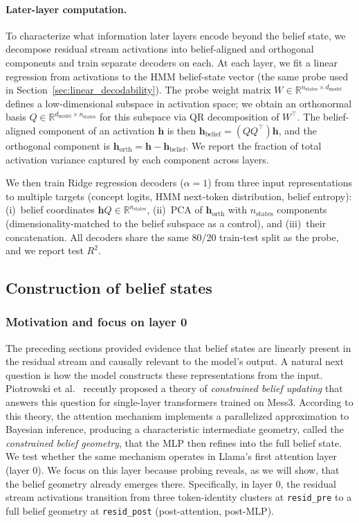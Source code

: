 \documentclass[midterm]{sparreport}
\begin{document}
\paragraph{Later-layer computation.}
\label{sec:later_layer_method}
To characterize what information later layers encode beyond the belief state, we decompose residual stream activations into belief-aligned and orthogonal components and train separate decoders on each. At each layer, we fit a linear regression from activations to the HMM belief-state vector (the same probe used in Section~\ref{sec:linear_decodability}). The probe weight matrix $W \in \mathbb{R}^{n_{\mathrm{states}} \times d_{\mathrm{model}}}$ defines a low-dimensional subspace in activation space; we obtain an orthonormal basis $Q \in \mathbb{R}^{d_{\mathrm{model}} \times n_{\mathrm{states}}}$ for this subspace via QR decomposition of $W^\top$. The belief-aligned component of an activation $\mathbf{h}$ is then $\mathbf{h}_{\mathrm{belief}} = (Q Q^\top) \mathbf{h}$, and the orthogonal component is $\mathbf{h}_{\mathrm{orth}} = \mathbf{h} - \mathbf{h}_{\mathrm{belief}}$. We report the fraction of total activation variance captured by each component across layers.

We then train Ridge regression decoders ($\alpha = 1$) from three input representations to multiple targets (concept logits, HMM next-token distribution, belief entropy): (i)~belief coordinates $\mathbf{h} Q \in \mathbb{R}^{n_{\mathrm{states}}}$, (ii)~PCA of $\mathbf{h}_{\mathrm{orth}}$ with $n_{\mathrm{states}}$ components (dimensionality-matched to the belief subspace as a control), and (iii)~their concatenation. All decoders share the same 80/20 train-test split as the probe, and we report test $R^2$.

\subsection{Construction of belief states}
\subsubsection{Motivation and focus on layer 0}
The preceding sections provided evidence that belief states are linearly present in the residual stream and causally relevant to the model's output. A natural next question is how the model constructs these representations from the input. Piotrowski et al.~\cite{piotrowski2025constrained} recently proposed a theory of \emph{constrained belief updating} that answers this question for single-layer transformers trained on Mess3. According to this theory, the attention mechanism implements a parallelized approximation to Bayesian inference, producing a characteristic intermediate geometry, called the \textit{constrained belief geometry}, that the MLP then refines into the full belief state. We test whether the same mechanism operates in Llama's first attention layer (layer 0). We focus on this layer because probing reveals, as we will show, that the belief geometry already emerges there. Specifically, in layer 0, the residual stream activations transition from three token-identity clusters at \texttt{resid\_pre} to a full belief geometry at \texttt{resid\_post} (post-attention, post-MLP).
\end{document}
